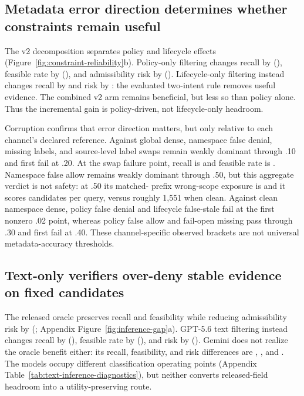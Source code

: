 \documentclass{article}
\begin{document}
\subsection{Metadata error direction determines whether constraints remain useful}

The v2 decomposition separates policy and lifecycle effects
(Figure~\ref{fig:constraint-reliability}b).  Policy-only filtering changes recall by
\PolicyOnlyRecallDelta{} (\PolicyOnlyRecallDeltaCI{}), feasible rate by
\PolicyOnlyFeasibleDelta{} (\PolicyOnlyFeasibleDeltaCI{}), and admissibility risk by
\PolicyOnlyAdmRiskDelta{} (\PolicyOnlyAdmRiskDeltaCI{}).  Lifecycle-only filtering
instead changes recall by \LifecycleOnlyRecallDelta{} and risk by
\LifecycleOnlyAdmRiskDelta{}: the evaluated two-intent rule removes useful evidence.
The combined v2 arm remains beneficial, but less so than policy alone.
Thus the incremental gain is policy-driven, not lifecycle-only headroom.

Corruption confirms that error direction matters, but only relative to each channel's
declared reference.  Against global dense, namespace false denial, missing labels,
and source-level label swaps remain weakly dominant through .10 and first fail at
.20.  At the swap failure point, recall is \NamespaceSwapTwentyRecall{} and feasible
rate is \NamespaceSwapTwentyFeasible{}.  Namespace false allow remains weakly
dominant through .50, but this aggregate verdict is not safety: at .50 its matched-
prefix wrong-scope exposure is \FalseAllowHalfWrongScope{} and it scores
\FalseAllowHalfCandidates{} candidates per query, versus roughly 1,551 when clean.
Against clean namespace dense, policy false denial and lifecycle false-stale fail at
the first nonzero .02 point, whereas policy false allow and fail-open missing pass
through .30 and first fail at .40.  These channel-specific observed brackets are not
universal metadata-accuracy thresholds.

\subsection{Text-only verifiers over-deny stable evidence on fixed candidates}

The released oracle preserves recall and feasibility while reducing admissibility
risk by \ReleasedOracleAdmRiskDelta{} (\ReleasedOracleAdmRiskDeltaCI{};
Appendix Figure~\ref{fig:inference-gap}a).  GPT-5.6 text filtering instead changes recall by
\OpenAIInferredRecallDelta{} (\OpenAIInferredRecallDeltaCI{}), feasible rate by
\OpenAIInferredFeasibleDelta{} (\OpenAIInferredFeasibleDeltaCI{}), and risk by
\OpenAIInferredAdmRiskDelta{} (\OpenAIInferredAdmRiskDeltaCI{}).  Gemini does not
realize the oracle benefit either: its recall, feasibility, and risk differences are
\GeminiInferredRecallDelta{}, \GeminiInferredFeasibleDelta{}, and
\GeminiInferredAdmRiskDelta{}.  The models occupy different classification operating
points (Appendix Table~\ref{tab:text-inference-diagnostics}), but neither converts
released-field headroom into a utility-preserving route.
\end{document}

